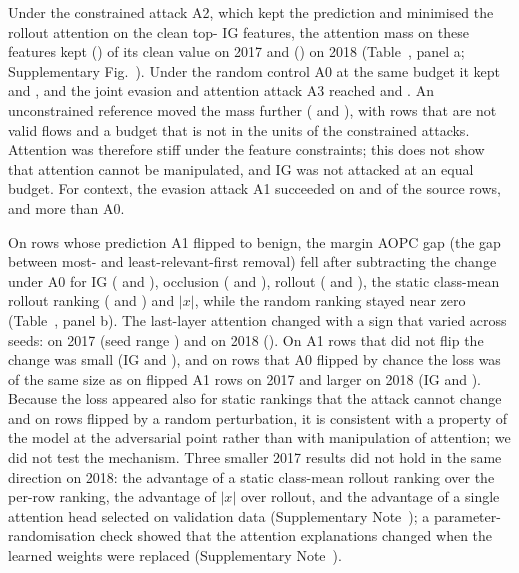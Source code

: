 Under the constrained attack A2, which kept the prediction and minimised the rollout attention on the clean
top-\paramTopK{} IG features, the attention mass on these features kept \massAtwoVoneSeventeen{}
(\massAtwoVoneSeventeenRange) of its clean value on 2017 and \massAtwoVoneEighteen{} (\massAtwoVoneEighteenRange) on
2018 (Table~\mainTabAttn, panel a; Supplementary Fig.~\suppFigMassRatio).
Under the random control A0 at the same budget it kept \massAzeroVoneSeventeen{} and \massAzeroVoneEighteen, and the
joint evasion and attention attack A3 reached \massAthreeVoneSeventeen{} and \massAthreeVoneEighteen.
An unconstrained reference moved the mass further (\massUncVoneSeventeen{} and \massUncVoneEighteen), with rows that
are not valid flows and a budget that is not in the units of the constrained attacks.
Attention was therefore stiff under the feature constraints; this does not show that attention cannot be manipulated,
and IG was not attacked at an equal budget.
For context, the evasion attack A1 succeeded on \succAoneVoneSeventeen{} and \succAoneVoneEighteen{} of the source
rows, \aoneMinusAzeroVoneSeventeen{} and \aoneMinusAzeroVoneEighteen{} more than A0.

On rows whose prediction A1 flipped to benign, the margin AOPC gap (the gap between most- and least-relevant-first
removal) fell after subtracting the change under A0 for IG (\flipIGVoneSeventeen{} and \flipIGVoneEighteen),
occlusion (\flipOcclVoneSeventeen{} and \flipOcclVoneEighteen), rollout (\flipRolloutVoneSeventeen{} and
\flipRolloutVoneEighteen), the static class-mean rollout ranking (\flipStaticRolloutVoneSeventeen{} and
\flipStaticRolloutVoneEighteen) and $|x|$, while the random ranking stayed near zero (Table~\mainTabAttn, panel b).
The last-layer attention changed with a sign that varied across seeds: \flipLastVoneSeventeen{} on 2017 (seed range
\flipLastVoneSeventeenRange) and \flipLastVoneEighteen{} on 2018 (\flipLastVoneEighteenRange).
On A1 rows that did not flip the change was small (IG \notflipIGVoneSeventeen{} and \notflipIGVoneEighteen), and on
rows that A0 flipped by chance the loss was of the same size as on flipped A1 rows on 2017 and larger on 2018 (IG
\azeroflipIGVoneSeventeen{} and \azeroflipIGVoneEighteen).
Because the loss appeared also for static rankings that the attack cannot change and on rows flipped by a random
perturbation, it is consistent with a property of the model at the adversarial point rather than with manipulation of
attention; we did not test the mechanism.
Three smaller 2017 results did not hold in the same direction on 2018: the advantage of a static class-mean rollout
ranking over the per-row ranking, the advantage of $|x|$ over rollout, and the advantage of a single attention head
selected on validation data (Supplementary Note~\suppNoteResults); a parameter-randomisation check showed that the
attention explanations changed when the learned weights were replaced (Supplementary Note~\suppNoteRand).

